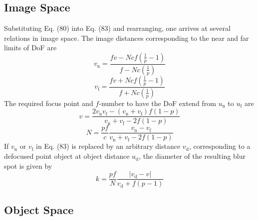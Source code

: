 \documentclass[11pt, oneside]{scrartcl}   	%
\begin{document}
\subsection{Image Space}
\label{sec:imspc}

Substituting Eq. (80) into Eq. (83) and rearranging, one arrives at several relations in image space. The image distances corresponding to the near and far limits of DoF are
\begin{equation}
   v_\mathrm{n} = \frac{fv - N\!cf\left(\frac1p - 1\right)}{f - N\!c\left(\frac1p \right)}
   \label{eq:84}
\end{equation}
\begin{equation}
   v_\mathrm{f} = \frac{fv + N\!cf\left(\frac1p - 1\right)}{f + N\!c\left(\frac1p \right)}
   \label{eq:85}
\end{equation}
The required focus point and $f$-number to have the DoF extend from $u_\mathrm{n}$ to $u_\mathrm{f}$ are
\begin{equation}
   v = \frac{2v_\mathrm{n}v_\mathrm{f} - (v_\mathrm{n} +v_\mathrm{f})f(1-p)}{v_\mathrm{n} +v_\mathrm{f}-2f(1-p)}
   \label{eq:86}
\end{equation}
\begin{equation}
   N = \frac{pf}c \frac{v_\mathrm{n} - v_\mathrm{f}}{v_\mathrm{n} +v_\mathrm{f}-2f(1-p)}
   \label{eq:87}
\end{equation}
If $v_\mathrm{n}$ or $v_\mathrm{f}$ in Eq. (83) is replaced by an arbitrary distance $v_\mathrm{d}$, corresponding to a defocused
point object at object distance $u_\mathrm{d}$, the diameter of the resulting blur spot is given by
\begin{equation}
   k = \frac{pf}N \frac{|v_\mathrm{d} - v|}{v_\mathrm{d} + f(p-1)}
   \label{eq:88}
\end{equation}

\subsection{Object Space}
\label{sec:objspc}
\end{document}
